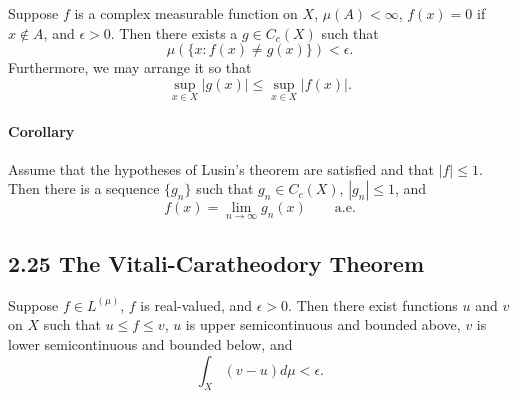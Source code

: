 \documentclass[11pt,reqno]{amsart}
\renewcommand{\(}{\left(}
\renewcommand{\)}{\right)}
\renewcommand{\[}{\left[}
\renewcommand{\]}{\right]}
\newcommand{\ep}{\epsilon}
\begin{document}
Suppose $f$ is a complex measurable function on $X$, $\mu(A) < \infty$, $f(x) = 0$ if $x \notin A$, and $\ep > 0$. Then there exists a $g \in C_c(X)$
such that \begin{equation}
  \mu(\{x : f(x) \neq g(x) \}) < \ep.
\end{equation}
Furthermore, we may arrange it so that \begin{equation}
  \sup_{x \in X} |g(x)| \le \sup_{x \in X} |f(x)|.
\end{equation}

\paragraph{Corollary}

Assume that the hypotheses of Lusin's theorem are satisfied and that $|f| \le 1$. Then there is a sequence $\{g_n\}$ such that 
$g_n \in C_c(X)$, $|g_n| \le 1$, and \begin{equation}
  f(x) = \lim _{n \to \infty} g_n (x) \qquad \text{a.e.}
\end{equation}

\subsection{2.25 The Vitali-Caratheodory Theorem}

Suppose $f \in L^(\mu)$, $f$ is real-valued, and $\ep > 0$. Then there exist functions $u$ and $v$ on $X$ such that $u \le f \le v$,
$u$ is upper semicontinuous and bounded above, $v$ is lower semicontinuous and bounded below, and \begin{equation}
  \int_X (v - u) d\mu < \ep.
\end{equation}
\end{document}
